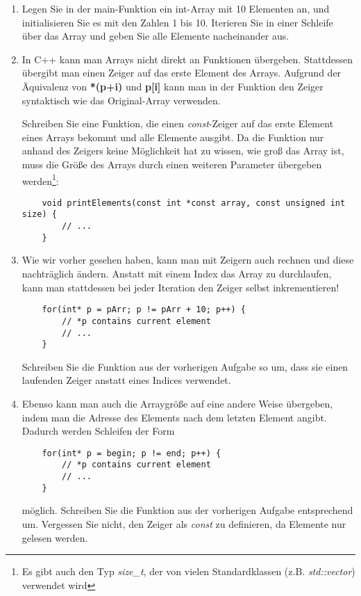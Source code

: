 \documentclass[
  accentcolor=tud1c,	%
  colorbacktitle,		%
  inverttitle,			%
  german,				%
  twoside
]{tudexercise}
\begin{document}
\begin{enumerate}
\item Legen Sie in der main-Funktion ein int-Array mit 10 Elementen an, und initialisieren Sie es mit den Zahlen 1 bis 10. Iterieren Sie in einer Schleife über das Array und geben Sie alle Elemente nacheinander aus.

\item In C++ kann man Arrays nicht direkt an Funktionen übergeben. Stattdessen übergibt man einen Zeiger auf das erste Element des Arrays. Aufgrund der Äquivalenz von \textbf{*(p+i) } und \textbf{p[i]} kann man in der Funktion den Zeiger syntaktisch wie das Original-Array verwenden.

Schreiben Sie eine Funktion, die einen \emph{const}-Zeiger auf das erste Element eines Arrays bekommt und alle Elemente ausgibt. Da die Funktion nur anhand des Zeigers keine Möglichkeit hat zu wissen, wie groß das Array ist, muss die Größe des Arrays durch einen weiteren Parameter übergeben werden\footnote{Es gibt auch den Typ \emph{size\_t}, der von vielen Standardklassen (z.B. \emph{std::vector}) verwendet wird}:
\begin{lstlisting}
	void printElements(const int *const array, const unsigned int size) {
		// ...
	}
\end{lstlisting}

\item Wie wir vorher gesehen haben, kann man mit Zeigern auch rechnen und diese nachträglich ändern. Anstatt mit einem Index das Array zu durchlaufen, kann man stattdessen bei jeder Iteration den Zeiger selbst inkrementieren! 

\begin{lstlisting}
	for(int* p = pArr; p != pArr + 10; p++) {
		// *p contains current element
		// ...
	}
\end{lstlisting}

Schreiben Sie die Funktion aus der vorherigen Aufgabe so um, dass sie einen laufenden Zeiger anstatt eines Indices verwendet.

\item Ebenso kann man auch die Arraygröße auf eine andere Weise übergeben, indem man  die Adresse des Elements nach dem letzten Element angibt. Dadurch werden Schleifen der Form
\begin{lstlisting}
	for(int* p = begin; p != end; p++) {
		// *p contains current element
		// ...
	}
\end{lstlisting}

möglich. Schreiben Sie die Funktion aus der vorherigen Aufgabe entsprechend um. Vergessen Sie nicht, den Zeiger als \emph{const} zu definieren, da Elemente nur gelesen werden.


\end{enumerate}
\end{document}
